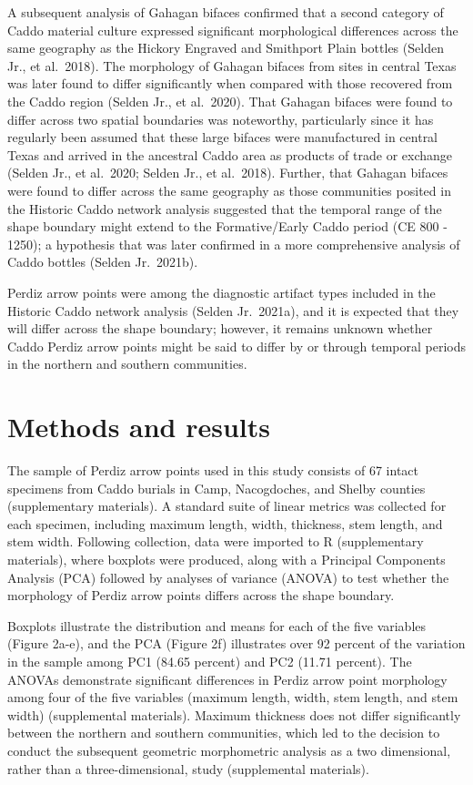 \documentclass[smallextended]{svjour3}       %
\begin{document}
A subsequent analysis of Gahagan bifaces confirmed that a second
category of Caddo material culture expressed significant morphological
differences across the same geography as the Hickory Engraved and
Smithport Plain bottles (Selden Jr., et al.~2018). The morphology of
Gahagan bifaces from sites in central Texas was later found to differ
significantly when compared with those recovered from the Caddo region
(Selden Jr., et al.~2020). That Gahagan bifaces were found to differ
across two spatial boundaries was noteworthy, particularly since it has
regularly been assumed that these large bifaces were manufactured in
central Texas and arrived in the ancestral Caddo area as products of
trade or exchange (Selden Jr., et al.~2020; Selden Jr., et al.~2018).
Further, that Gahagan bifaces were found to differ across the same
geography as those communities posited in the Historic Caddo network
analysis suggested that the temporal range of the shape boundary might
extend to the Formative/Early Caddo period (CE 800 - 1250); a hypothesis
that was later confirmed in a more comprehensive analysis of Caddo
bottles (Selden Jr.~2021b).

Perdiz arrow points were among the diagnostic artifact types included in
the Historic Caddo network analysis (Selden Jr.~2021a), and it is
expected that they will differ across the shape boundary; however, it
remains unknown whether Caddo Perdiz arrow points might be said to
differ by or through temporal periods in the northern and southern
communities.

\hypertarget{methods-and-results}{%
\section{Methods and results}\label{methods-and-results}}

The sample of Perdiz arrow points used in this study consists of 67
intact specimens from Caddo burials in Camp, Nacogdoches, and Shelby
counties (supplementary materials). A standard suite of linear metrics
was collected for each specimen, including maximum length, width,
thickness, stem length, and stem width. Following collection, data were
imported to R (supplementary materials), where boxplots were produced,
along with a Principal Components Analysis (PCA) followed by analyses of
variance (ANOVA) to test whether the morphology of Perdiz arrow points
differs across the shape boundary.

Boxplots illustrate the distribution and means for each of the five
variables (Figure 2a-e), and the PCA (Figure 2f) illustrates over 92
percent of the variation in the sample among PC1 (84.65 percent) and PC2
(11.71 percent). The ANOVAs demonstrate significant differences in
Perdiz arrow point morphology among four of the five variables (maximum
length, width, stem length, and stem width) (supplemental materials).
Maximum thickness does not differ significantly between the northern and
southern communities, which led to the decision to conduct the
subsequent geometric morphometric analysis as a two dimensional, rather
than a three-dimensional, study (supplemental materials).
\end{document}
